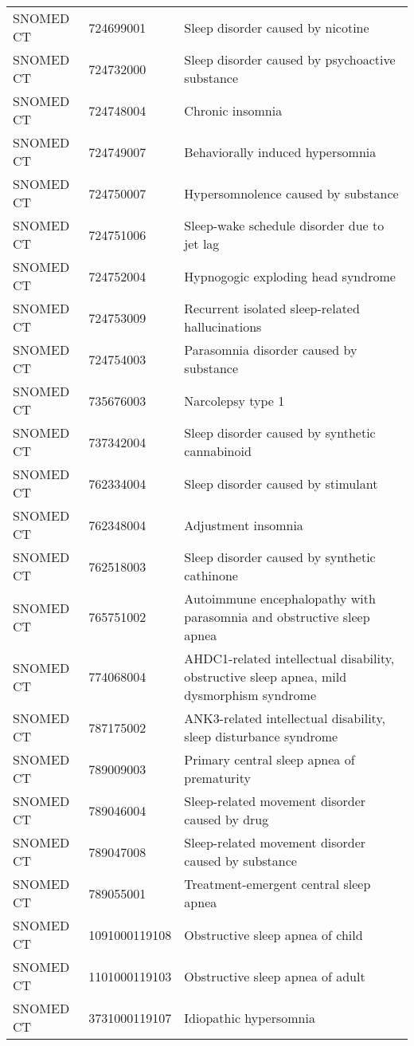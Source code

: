 \begin{longtable}{p{}p{}p{}}
  SNOMED CT & 724699001 & Sleep disorder caused by nicotine \\ 
  SNOMED CT & 724732000 & Sleep disorder caused by psychoactive substance \\ 
  SNOMED CT & 724748004 & Chronic insomnia \\ 
  SNOMED CT & 724749007 & Behaviorally induced hypersomnia \\ 
  SNOMED CT & 724750007 & Hypersomnolence caused by substance \\ 
  SNOMED CT & 724751006 & Sleep-wake schedule disorder due to jet lag \\ 
  SNOMED CT & 724752004 & Hypnogogic exploding head syndrome \\ 
  SNOMED CT & 724753009 & Recurrent isolated sleep-related hallucinations \\ 
  SNOMED CT & 724754003 & Parasomnia disorder caused by substance \\ 
  SNOMED CT & 735676003 & Narcolepsy type 1 \\ 
  SNOMED CT & 737342004 & Sleep disorder caused by synthetic cannabinoid \\ 
  SNOMED CT & 762334004 & Sleep disorder caused by stimulant \\ 
  SNOMED CT & 762348004 & Adjustment insomnia \\ 
  SNOMED CT & 762518003 & Sleep disorder caused by synthetic cathinone \\ 
  SNOMED CT & 765751002 & Autoimmune encephalopathy with parasomnia and obstructive sleep apnea \\ 
  SNOMED CT & 774068004 & AHDC1-related intellectual disability, obstructive sleep apnea, mild dysmorphism syndrome \\ 
  SNOMED CT & 787175002 & ANK3-related intellectual disability, sleep disturbance syndrome \\ 
  SNOMED CT & 789009003 & Primary central sleep apnea of prematurity \\ 
  SNOMED CT & 789046004 & Sleep-related movement disorder caused by drug \\ 
  SNOMED CT & 789047008 & Sleep-related movement disorder caused by substance \\ 
  SNOMED CT & 789055001 & Treatment-emergent central sleep apnea \\ 
  SNOMED CT & 1091000119108 & Obstructive sleep apnea of child \\ 
  SNOMED CT & 1101000119103 & Obstructive sleep apnea of adult \\ 
  SNOMED CT & 3731000119107 & Idiopathic hypersomnia \\ 

\end{longtable}
